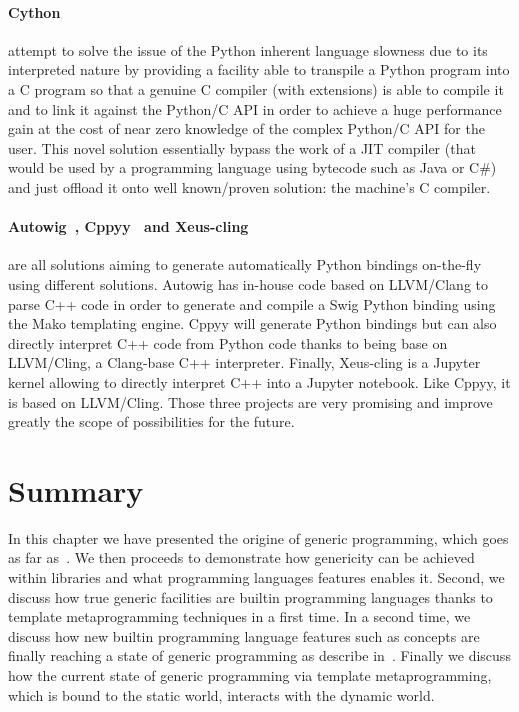 \paragraph{Cython~\parencite{behnel.2010.cython}} attempt to solve the issue of the Python inherent language slowness
due to its interpreted nature by providing a facility able to transpile a Python program into a C program so that a
genuine C compiler (with extensions) is able to compile it and to link it against the Python/C API in order to achieve a
huge performance gain at the cost of near zero knowledge of the complex Python/C API for the user. This novel solution
essentially bypass the work of a JIT compiler (that would be used by a programming language using bytecode such as Java
or C\#) and just offload it onto well known/proven solution: the machine's C compiler.

\paragraph{Autowig~\parencite{fernique.2018.autowig}, Cppyy~\parencite{wimtlplavrijsen.2016.cppyy} and
  Xeus-cling~\parencite{quantstack.2021.xeus-cling}} are all solutions aiming to generate automatically Python bindings
on-the-fly using different solutions. Autowig has in-house code based on LLVM/Clang to parse C++ code in order to
generate and compile a Swig Python binding using the Mako templating engine. Cppyy will generate Python bindings but can
also directly interpret C++ code from Python code thanks to being base on LLVM/Cling, a Clang-base C++ interpreter.
Finally, Xeus-cling is a Jupyter~\parencite{kluyver.2016.jupyter} kernel allowing to directly interpret C++ into a
Jupyter notebook. Like Cppyy, it is based on LLVM/Cling. Those three projects are very promising and improve greatly the
scope of possibilities for the future.


\section{Summary}

In this chapter we have presented the origine of generic programming, which goes as far
as~. We then proceeds to demonstrate how genericity can be achieved within libraries
and what programming languages features enables it. Second, we discuss how true generic facilities are builtin
programming languages thanks to template metaprogramming techniques in a first time. In a second time, we discuss how
new builtin programming language features such as concepts are finally reaching a state of generic programming as
describe in~\parencite{dehnert.1998.fundamentals}. Finally we discuss how the current state of generic programming via
template metaprogramming, which is bound to the static world, interacts with the dynamic world.